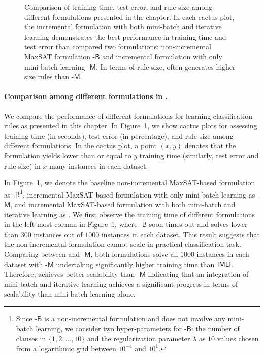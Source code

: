 \begin{figure}[!t]
	
	\caption[Training time, test error, and rule-size of different formulations in {\imli}]{Comparison of training time, test error, and rule-size among different formulations presented in the chapter. In each cactus plot, the incremental formulation {\imli} with both mini-batch and iterative learning demonstrates the best performance in training time and test error than compared two formulations: non-incremental MaxSAT formulation {\imli}-$\mathsf{B}$ and incremental formulation with only mini-batch learning {\imli}-$\mathsf{M}$. In terms of rule-size, {\imli} often generates higher size rules than {\imli}-$\mathsf{M}$.}
	\label{interpretability_imli_fig:different_formulations}
\end{figure}



\paragraph{Comparison among different formulations in {\imli}.}  We compare the performance of different formulations for learning classification rules as presented in this chapter. In Figure~\ref{interpretability_imli_fig:different_formulations}, we show cactus plots for assessing training time (in seconds), test error (in percentage), and rule-size among different formulations. In the cactus plot, a point $ (x,y) $ denotes that the formulation yields lower than or equal to $ y $ training time (similarly, test error and rule-size) in $ x $ many instances in each dataset.

In Figure~\ref{interpretability_imli_fig:different_formulations}, we denote the baseline non-incremental MaxSAT-based formulation as {\imli}-$\mathsf{B}$\footnote{Since  {\imli}-$\mathsf{B}$ is a non-incremental formulation and does not involve any mini-batch learning, we consider two hyper-parameters for {\imli}-$\mathsf{B}$: the number of clauses in $ \{1, 2, \dots, 10\} $ and the regularization parameter $ \lambda $ as $ 10 $ values chosen from a logarithmic grid between $ 10^{-4} $ and $ 10^1 $.}, incremental MaxSAT-based formulation with only mini-batch learning as {\imli}-$\mathsf{M}$, and incremental MaxSAT-based formulation with both mini-batch and iterative learning as {\imli}.  We first observe the training time of different formulations in the left-most column in Figure~\ref{interpretability_imli_fig:different_formulations}, where {\imli}-$\mathsf{B}$ soon times out and solves lower than $ 300 $ instances out of $ 1000 $ instances in each dataset. This result suggests that the non-incremental formulation cannot scale in practical classification task. Comparing between {\imli} and {\imli}-$\mathsf{M}$, both formulations solve all $ 1000 $ instances in each dataset with {\imli}-$\mathsf{M}$ undertaking significantly higher training time than $ {\mathsf{IMLI}} $.  Therefore, {\imli} achieves better scalability than {\imli}-$\mathsf{M}$ indicating that an integration of mini-batch and iterative learning achieves a significant progress in terms of scalability than mini-batch learning alone. 

